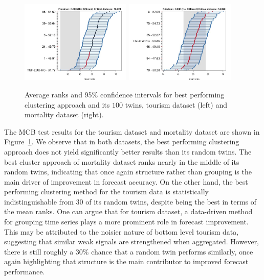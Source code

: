 \documentclass[a4paper,review,12pt,authoryear]{elsarticle}
\begin{document}
\begin{figure}[!h]
    \centering
    \includegraphics[width=0.47\textwidth]{../figures/Figure7_tourism_cluster_vs_pc.jpg}
    \includegraphics[width=0.47\textwidth]{../figures/Figure7_mortality_cluster_vs_pc.jpg}
    \caption{\label{fig:P3_tourism_c_vs_pc}Average ranks and 95\% confidence intervals for best performing clustering approach and its $100$ twins, tourism dataset (left) and mortality dataset (right).}
\end{figure}


The MCB test results for the tourism dataset and mortality dataset are shown in Figure~\ref{fig:P3_tourism_c_vs_pc}.
We observe that in both datasets, the best performing clustering approach does not yield significantly better results than its random twins. 
The best cluster approach of mortality dataset ranks nearly in the middle of its random twins, indicating that once again structure rather than grouping is the main driver of improvement in forecast accuracy. 
On the other hand, the best performing clustering method for the tourism data is statistically indistinguishable from 30 of its random twins, despite being the best in terms of the mean ranks. One can argue that for tourism dataset, a data-driven method for grouping time series plays a more prominent role in forecast improvement. 
This may be attributed to the noisier nature of bottom level tourism data, suggesting that similar weak signals are strengthened when aggregated.
However, there is still roughly a 30\% chance that a random twin performs similarly, once again highlighting that structure is the main contributor to improved forecast performance.
\end{document}
